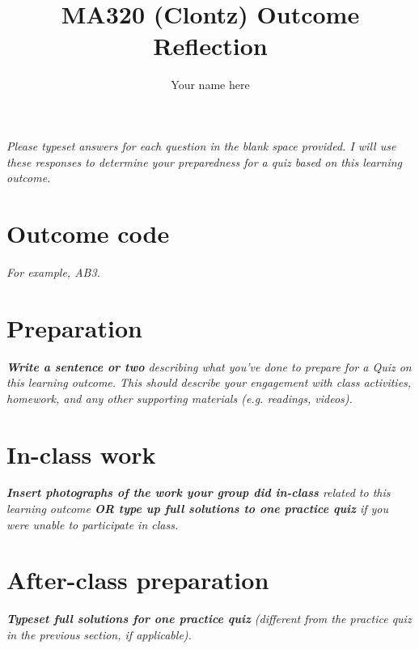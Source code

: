 \documentclass{article}
\title{MA320 (Clontz) Outcome Reflection}
\author{Your name here}
\begin{document}
\maketitle

\textit{Please typeset answers for each question in the blank space provided.
I will use these responses to determine your preparedness for a quiz
based on this learning outcome.}

\section{Outcome code}
\textit{For example, AB3.}








\section{Preparation}
\textit{\textbf{Write a sentence or two} describing what you’ve done to prepare for a Quiz on this learning outcome. This should describe your engagement with class activities, homework, and any other supporting materials (e.g. readings, videos).}








\section{In-class work}
\textit{\textbf{Insert photographs of the work your group did in-class} related to this learning outcome \textbf{OR type up full solutions to one practice quiz} if you were unable to participate in class.}






\section{After-class preparation}
\textit{\textbf{Typeset full solutions for one practice quiz} (different from the practice quiz in the previous section, if applicable).}
\end{document}
